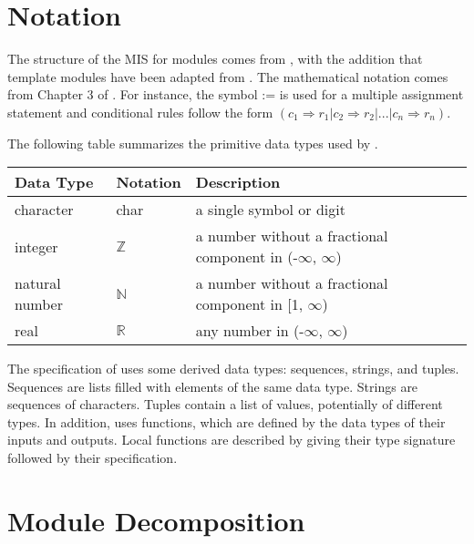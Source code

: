 \documentclass[12pt, titlepage]{article}
\begin{document}
\section{Notation}


The structure of the MIS for modules comes from \citet{HoffmanAndStrooper1995},
with the addition that template modules have been adapted from
\cite{GhezziEtAl2003}.  The mathematical notation comes from Chapter 3 of
\citet{HoffmanAndStrooper1995}.  For instance, the symbol := is used for a
multiple assignment statement and conditional rules follow the form $(c_1
\Rightarrow r_1 | c_2 \Rightarrow r_2 | ... | c_n \Rightarrow r_n )$.

The following table summarizes the primitive data types used by . 

\begin{center}
\renewcommand{\arraystretch}{1.2}
\noindent 
\begin{tabular}{l l p{7.5cm}} 
\toprule 
\textbf{Data Type} & \textbf{Notation} & \textbf{Description}\\ 
\midrule
character & char & a single symbol or digit\\
integer & $\mathbb{Z}$ & a number without a fractional component in (-$\infty$, $\infty$) \\
natural number & $\mathbb{N}$ & a number without a fractional component in [1, $\infty$) \\
real & $\mathbb{R}$ & any number in (-$\infty$, $\infty$)\\
\bottomrule
\end{tabular} 
\end{center}

\noindent
The specification of  uses some derived data types: sequences, strings, and
tuples. Sequences are lists filled with elements of the same data type. Strings
are sequences of characters. Tuples contain a list of values, potentially of
different types. In addition,  uses functions, which
are defined by the data types of their inputs and outputs. Local functions are
described by giving their type signature followed by their specification.

\section{Module Decomposition}
\end{document}
